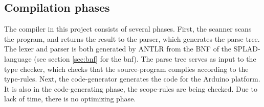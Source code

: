 \subsection{Compilation phases}
\label{sec:CompilationPasses}
The compiler in this project consists of several phases. First, the scanner scans the program, and returns the result to the parser, which generates the parse tree. The lexer and parser is both generated by ANTLR \citep{ANTLR} from the BNF of the SPLAD-language (see section \ref{sec:bnf} for the bnf). The parse tree serves as input to the type checker, which checks that the source-program complies according to the type-rules. Next, the code-generator generates the code for the Arduino platform. It is also in the code-generating phase, the scope-rules are being checked. Due to lack of time, there is no optimizing phase. 